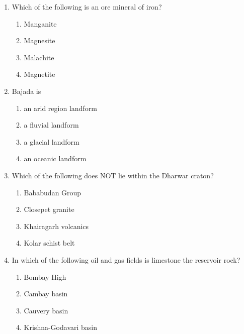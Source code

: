 \documentclass[journal,12pt,onecolumn]{IEEEtran}
\theoremstyle{remark}
\begin{document}
\begin{enumerate}
\item Which of the following is an ore mineral of iron?
\begin{multicols}{4}
\begin{enumerate}
\item Manganite
\item Magnesite
\item Malachite
\item Magnetite
\end{enumerate}
\end{multicols}
\vspace{0.5cm}

\item Bajada is
\begin{multicols}{2}
\begin{enumerate}
\item an arid region landform
\item a fluvial landform
\item a glacial landform
\item an oceanic landform
\end{enumerate}
\end{multicols}
\vspace{0.5cm}

\item Which of the following does NOT lie within the Dharwar craton?
\begin{multicols}{2}
\begin{enumerate}
\item Bababudan Group
\item Closepet granite
\item Khairagarh volcanics
\item Kolar schist belt
\end{enumerate}
\end{multicols}
\vspace{0.5cm}

\item In which of the following oil and gas fields is limestone the reservoir rock?
\begin{multicols}{2}
\begin{enumerate}
\item Bombay High
\item Cambay basin
\item Cauvery basin
\item Krishna-Godavari basin
\end{enumerate}
\end{multicols}
\vspace{0.5cm}


\end{enumerate}
\end{document}
